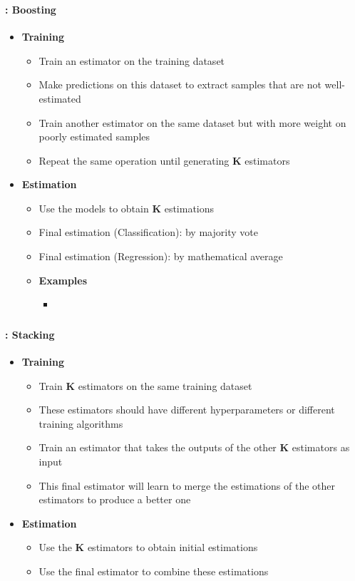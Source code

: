 \documentclass[xcolor=table]{beamer}
\begin{document}
\begin{frame}
	\frametitle{\insertsection}
	\framesubtitle{\insertsubsection: Boosting}
	
	\begin{itemize}
		\item \textbf{Training}
		\begin{itemize}
			\item Train an estimator on the training dataset
			\item Make predictions on this dataset to extract samples that are not well-estimated
			\item Train another estimator on the same dataset but with more weight on poorly estimated samples
			\item Repeat the same operation until generating \textbf{K} estimators
		\end{itemize}
		\item \textbf{Estimation}
		\begin{itemize}
			\item Use the models to obtain \textbf{K} estimations
			\item Final estimation (Classification): by majority vote
			\item Final estimation (Regression): by mathematical average
			\item \textbf{Examples}
			\begin{itemize}
				\item {}
			\end{itemize}
		\end{itemize}
	\end{itemize}
	
\end{frame}


\begin{frame}
	\frametitle{\insertsection}
	\framesubtitle{\insertsubsection: Stacking}
	
	\begin{itemize}
		\item \textbf{Training}
		\begin{itemize}
			\item Train \textbf{K} estimators on the same training dataset
			\item These estimators should have different hyperparameters or different training algorithms
			\item Train an estimator that takes the outputs of the other \textbf{K} estimators as input
			\item This final estimator will learn to merge the estimations of the other estimators to produce a better one
		\end{itemize}
		\item \textbf{Estimation}
		\begin{itemize}
			\item Use the \textbf{K} estimators to obtain initial estimations
			\item Use the final estimator to combine these estimations
		\end{itemize}
	\end{itemize}
	
\end{frame}
\end{document}

